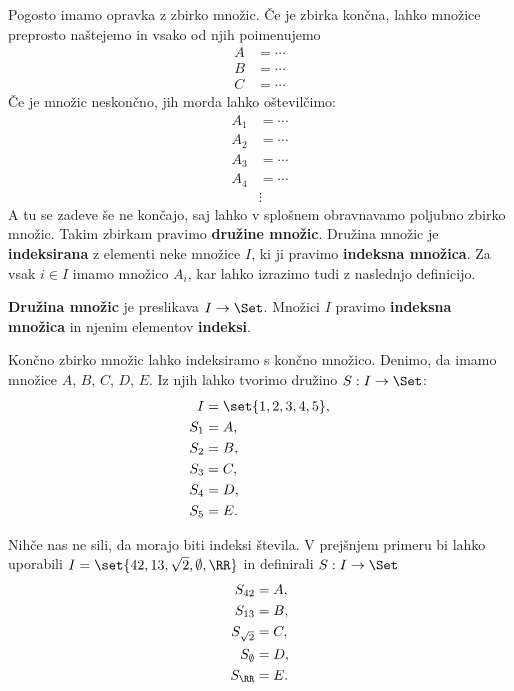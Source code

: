 Pogosto imamo opravka z zbirko množic. Če je zbirka končna, lahko množice preprosto
naštejemo in vsako od njih poimenujemo
%
\begin{align*}
    A &= \cdots \\
    B &= \cdots \\
    C &= \cdots
\end{align*}
%
Če je množic neskončno, jih morda lahko oštevilčimo:
%
\begin{align*}
    A_1 &= \cdots \\
    A_2 &= \cdots \\
    A_3 &= \cdots \\
    A_4 &= \cdots \\
        &\vdots
\end{align*}
%
A tu se zadeve še ne končajo, saj lahko v splošnem obravnavamo poljubno zbirko množic.
Takim zbirkam pravimo \textbf{družine množic}. Družina množic je \textbf{indeksirana} z elementi neke množice $I$, ki ji pravimo \textbf{indeksna množica}. Za vsak $i \in I$ imamo množico $A_i$,  kar lahko izrazimo tudi z naslednjo definicijo.

\begin{definicija}
  \textbf{Družina množic} je preslikava $I \to \Set$. Množici $I$ pravimo \textbf{indeksna množica} in njenim elementov \textbf{indeksi}.
\end{definicija}


\begin{primer}
  Končno zbirko množic lahko indeksiramo s končno množico. Denimo, da imamo
  množice $A$, $B$, $C$, $D$, $E$. Iz njih lahko tvorimo družino $S : I \to \Set$:
  \begin{align*}
  I &= \set{1, 2, 3, 4, 5}, \\
  S_1 &= A,\\
  S_2 &= B,\\
  S_3 &= C,\\
  S_4 &= D,\\
  S_5 &= E.
  \end{align*}
\end{primer}

\begin{primer}
  Nihče nas ne sili, da morajo biti indeksi števila. V prejšnjem primeru bi lahko
  uporabili $I = \set{42, 13, \sqrt{2}, \emptyset, \RR}$ in definirali $S : I \to \Set$
  \begin{align*}
  S_{42} &= A,\\
  S_{13} &= B,\\
  S_{\sqrt{2}} &= C,\\
  S_{\emptyset} &= D,\\
  S_{\RR} &= E.
  \end{align*}
\end{primer}


